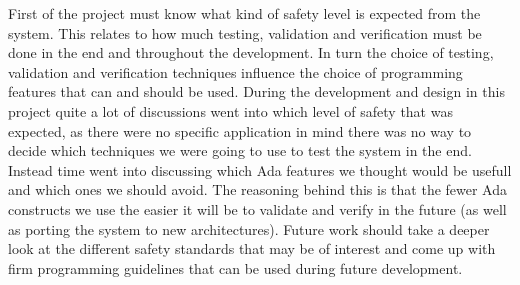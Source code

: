 First of the project must know what kind of safety level is expected from the
system. This relates to how much testing, validation and verification must
be done in the end and throughout the development. In turn the choice of
testing, validation and verification techniques influence the choice of
programming features that can and should be used. During the development and
design in this project quite a lot of discussions went into which level of
safety that was expected, as there were no specific application in mind
there was no way to decide which techniques we were going to use to test the
system in the end. Instead time went into discussing which Ada features we
thought would be usefull and which ones we should avoid. The reasoning
behind this is that the fewer Ada constructs we use the easier it will be to
validate and verify in the future (as well as porting the system to new
architectures). Future work should take a deeper look at the different safety
standards that may be of interest and come up with firm programming guidelines
that can be used during future development.

%
% 
% 

